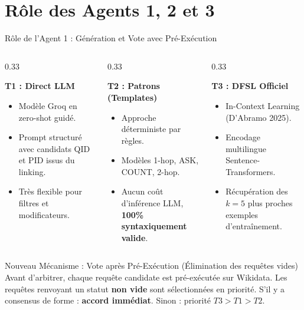 \documentclass[10pt,aspectratio=169]{beamer}
\begin{document}
\section{Rôle des Agents 1, 2 et 3}

\begin{frame}{Rôle de l'Agent 1 : Génération et Vote avec Pré-Exécution}
  \begin{columns}
    \begin{column}{0.33\textwidth}
      \begin{block}{\textbf{T1 : Direct LLM}}
        \begin{itemize}
          \item Modèle Groq en zero-shot guidé.
          \item Prompt structuré avec candidats QID et PID issus du linking.
          \item Très flexible pour filtres et modificateurs.
        \end{itemize}
      \end{block}
    \end{column}
    \begin{column}{0.33\textwidth}
      \begin{block}{\textbf{T2 : Patrons (Templates)}}
        \begin{itemize}
          \item Approche déterministe par règles.
          \item Modèles 1-hop, ASK, COUNT, 2-hop.
          \item Aucun coût d'inférence LLM, \textbf{100\% syntaxiquement valide}.
        \end{itemize}
      \end{block}
    \end{column}
    \begin{column}{0.33\textwidth}
      \begin{block}{\textbf{T3 : DFSL Officiel}}
        \begin{itemize}
          \item In-Context Learning (D'Abramo 2025).
          \item Encodage multilingue Sentence-Transformers.
          \item Récupération des $k=5$ plus proches exemples d'entraînement.
        \end{itemize}
      \end{block}
    \end{column}
  \end{columns}

  \vspace{0.3cm}
  \begin{alertblock}{Nouveau Mécanisme : Vote après Pré-Exécution (Élimination des requêtes vides)}
    Avant d'arbitrer, chaque requête candidate est pré-exécutée sur Wikidata. Les requêtes renvoyant un statut \textbf{non vide} sont sélectionnées en priorité. S'il y a consensus de forme : \textbf{accord immédiat}. Sinon : priorité \textbf{$T3 > T1 > T2$}.
  \end{alertblock}
\end{frame}
\end{document}
